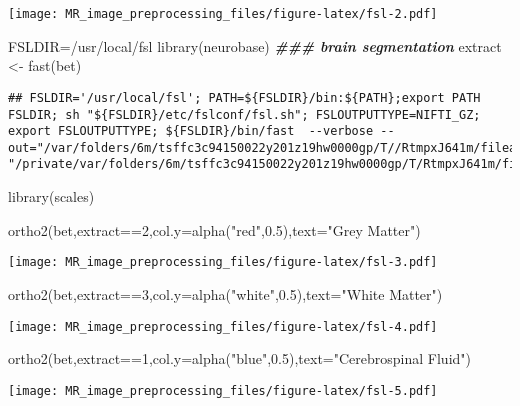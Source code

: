 \documentclass[
]{article}
\newenvironment{Shaded}{\begin{snugshade}}{\end{snugshade}}
\newcommand{\AttributeTok}[1]{\textcolor[rgb]{0.77,0.63,0.00}{#1}}
\newcommand{\DecValTok}[1]{\textcolor[rgb]{0.00,0.00,0.81}{#1}}
\newcommand{\DocumentationTok}[1]{\textcolor[rgb]{0.56,0.35,0.01}{\textbf{\textit{#1}}}}
\newcommand{\FloatTok}[1]{\textcolor[rgb]{0.00,0.00,0.81}{#1}}
\newcommand{\FunctionTok}[1]{\textcolor[rgb]{0.00,0.00,0.00}{#1}}
\newcommand{\NormalTok}[1]{#1}
\newcommand{\OtherTok}[1]{\textcolor[rgb]{0.56,0.35,0.01}{#1}}
\newcommand{\SpecialCharTok}[1]{\textcolor[rgb]{0.00,0.00,0.00}{#1}}
\newcommand{\StringTok}[1]{\textcolor[rgb]{0.31,0.60,0.02}{#1}}
\begin{document}
\texttt{[image: MR\_image\_preprocessing\_files/figure-latex/fsl-2.pdf]}

\begin{Shaded}
\begin{Highlighting}[]
\NormalTok{FSLDIR}\OtherTok{=}\StringTok{\textquotesingle{}/usr/local/fsl\textquotesingle{}}
\FunctionTok{library}\NormalTok{(neurobase)}
\DocumentationTok{\#\#\# brain segmentation}
\NormalTok{extract }\OtherTok{\textless{}{-}} \FunctionTok{fast}\NormalTok{(bet)}
\end{Highlighting}
\end{Shaded}

\begin{verbatim}
## FSLDIR='/usr/local/fsl'; PATH=${FSLDIR}/bin:${PATH};export PATH FSLDIR; sh "${FSLDIR}/etc/fslconf/fsl.sh"; FSLOUTPUTTYPE=NIFTI_GZ; export FSLOUTPUTTYPE; ${FSLDIR}/bin/fast  --verbose --out="/var/folders/6m/tsffc3c94150022y201z19hw0000gp/T//RtmpxJ641m/filea8013d9a7843" "/private/var/folders/6m/tsffc3c94150022y201z19hw0000gp/T/RtmpxJ641m/filea8012d63699.nii.gz";
\end{verbatim}

\begin{Shaded}
\begin{Highlighting}[]
\FunctionTok{library}\NormalTok{(scales)}

\FunctionTok{ortho2}\NormalTok{(bet,extract}\SpecialCharTok{==}\DecValTok{2}\NormalTok{,}\AttributeTok{col.y=}\FunctionTok{alpha}\NormalTok{(}\StringTok{"red"}\NormalTok{,}\FloatTok{0.5}\NormalTok{),}\AttributeTok{text=}\StringTok{"Grey Matter"}\NormalTok{)}
\end{Highlighting}
\end{Shaded}

\texttt{[image: MR\_image\_preprocessing\_files/figure-latex/fsl-3.pdf]}

\begin{Shaded}
\begin{Highlighting}[]
\FunctionTok{ortho2}\NormalTok{(bet,extract}\SpecialCharTok{==}\DecValTok{3}\NormalTok{,}\AttributeTok{col.y=}\FunctionTok{alpha}\NormalTok{(}\StringTok{"white"}\NormalTok{,}\FloatTok{0.5}\NormalTok{),}\AttributeTok{text=}\StringTok{"White Matter"}\NormalTok{)}
\end{Highlighting}
\end{Shaded}

\texttt{[image: MR\_image\_preprocessing\_files/figure-latex/fsl-4.pdf]}

\begin{Shaded}
\begin{Highlighting}[]
\FunctionTok{ortho2}\NormalTok{(bet,extract}\SpecialCharTok{==}\DecValTok{1}\NormalTok{,}\AttributeTok{col.y=}\FunctionTok{alpha}\NormalTok{(}\StringTok{"blue"}\NormalTok{,}\FloatTok{0.5}\NormalTok{),}\AttributeTok{text=}\StringTok{"Cerebrospinal Fluid"}\NormalTok{)}
\end{Highlighting}
\end{Shaded}

\texttt{[image: MR\_image\_preprocessing\_files/figure-latex/fsl-5.pdf]}
\end{document}
